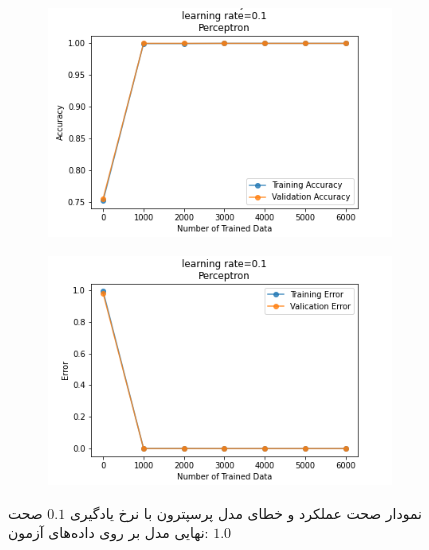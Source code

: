 \documentclass[12pt, a4paper]{article}
\begin{document}
\begin{figure}[h]
    \begin{subfigure}{0.45\linewidth}
        \centering
        \includegraphics[width=\linewidth]{images/3/perceptron/lr/acc_0.1.png}
    \end{subfigure}
    \hfil
    \begin{subfigure}{0.45\linewidth}
        \centering
        \includegraphics[width=\linewidth]{images/3/perceptron/lr/error_0.1.png}
    \end{subfigure}
    \caption{نمودار صحت عملکرد‌ و خطای مدل پرسپترون با نرخ یادگیری $0.1$
    \newline
    صحت نهایی مدل بر روی داده‌های آزمون: $1.0$}
\end{figure}

\clearpage
\end{document}
